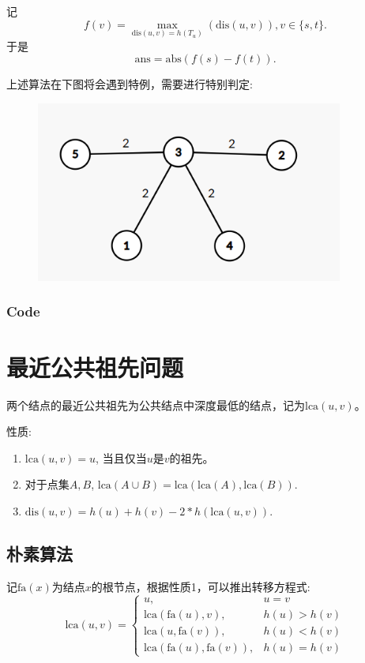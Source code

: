 \documentclass{article}
\newcommand{\dis}{\text{dis}}
\newcommand{\ans}{\text{ans}}
\newcommand{\lca}{\text{lca}}
\newcommand{\fa}{\text{fa}}
\renewcommand{\abs}{\text{abs}}
\newcommand{\inputcppfile}[1]{}
\begin{document}
记\begin{equation}
    f(v) = \max_{\dis(u,v) = h(T_u)}(\dis(u,v)), v \in \{s,t\}.
\end{equation}
于是
\begin{equation}
    \ans = \abs(f(s) - f(t)).
\end{equation}

上述算法在下图将会遇到特例，需要进行特别判定:
\begin{figure}[H]
    \centering
    \includegraphics[width = 0.9\textwidth]{fig2.png}
\end{figure}

\subsubsection{Code}
\inputcppfile{Code_8.cpp}

\section{最近公共祖先问题}
两个结点的最近公共祖先为公共结点中深度最低的结点，记为$\lca(u,v)$。

性质:
\begin{enumerate}
    \item $\lca(u,v) = u$, 当且仅当$u$是$v$的祖先。
    \item 对于点集$A,B$, $\lca(A\cup B) = \lca(\lca(A),\lca(B))$.
    \item $\dis(u,v) = h(u)+h(v) - 2*h(\lca(u,v))$.
\end{enumerate}

\subsection{朴素算法}
记$\fa(x)$为结点$x$的根节点，根据性质1，可以推出转移方程式:
\begin{equation}
    \lca(u,v) = \begin{cases}
        u,                   & u = v       \\
        \lca(\fa(u),v),      & h(u)> h(v)  \\
        \lca(u,\fa(v)),      & h(u)< h(v)  \\
        \lca(\fa(u),\fa(v)), & h(u) = h(v)
    \end{cases}
\end{equation}
\end{document}
